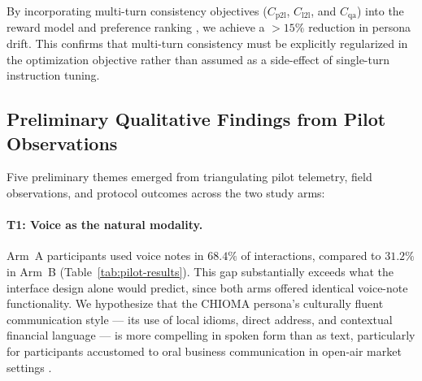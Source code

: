 By incorporating multi-turn consistency objectives ($C_{\text{p2l}}$, $C_{\text{l2l}}$, and $C_{\text{qa}}$) into the reward model and preference ranking \citep{abdulhai2025personas}, we achieve a $>15\%$ reduction in persona drift. This confirms that multi-turn consistency must be explicitly regularized in the optimization objective rather than assumed as a side-effect of single-turn instruction tuning.

\subsection{Preliminary Qualitative Findings from Pilot Observations}
\label{subsec:discussion-qualitative}


Five preliminary themes emerged from triangulating pilot telemetry, field observations, and protocol outcomes across the two study arms:

\paragraph{T1: Voice as the natural modality.}
Arm~A participants used voice notes in $68.4\%$ of interactions, compared to $31.2\%$ in Arm~B (Table~\ref{tab:pilot-results}). This gap substantially exceeds what the interface design alone would predict, since both arms offered identical voice-note functionality. We hypothesize that the CHIOMA persona's culturally fluent communication style --- its use of local idioms, direct address, and contextual financial language --- is more compelling in spoken form than as text, particularly for participants accustomed to oral business communication in open-air market settings \citep{aker2010mobile}.

